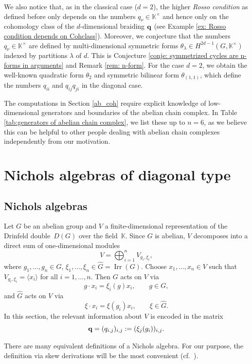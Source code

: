\documentclass[pdftex]{sigma}
\numberwithin{equation}{section}
\newcommand{\qq }{{\bf q}}
\newcommand{\KK }{\mathbb{K}}
\DeclareMathOperator{\Irr}{Irr}
\begin{document}
We also notice that, as in the classical case ($d=2$), the higher \textit{Rosso condition} as defined before only depends on the numbers $q_\nu \in \KK^\times$ and hence only on the cohomology class of the $d$-dimensional braiding $\qq$ (see Example \ref{ex: Rosso condition depends on Cohclass}). Moreover, we conjecture that the numbers $q_\nu \in \KK^\times$ are defined by multi-dimensional symmetric forms $\theta_\lambda \in H^{2d-1}(G,\KK^\times)$ indexed by partitions $\lambda$ of $d$. This is Conjecture \ref{conje: symmetrized cycles are n-forms in arguments} and Remark \ref{rem: n-form}. For the case $d=2$, we obtain the well-known quadratic form $\theta_2$ and symmetric bilinear form $\theta_{(1,1)}$, which define the numbers $q_{ii}$ and $q_{ij}q_{ji}$ in the diagonal case.

The computations in Section \ref{ab_coh} require explicit knowledge of low-dimensional generators and boundaries of the abelian chain complex. In Table \ref{tab:generators of abelian chain complex}, we list these up to $n=6$, as we believe this can be helpful to other people dealing with abelian chain complexes independently from our motivation.

\section{Nichols algebras of diagonal type}

\subsection{Nichols algebras}\label{sec: Nichols algebras}

Let $G$ be an abelian group and $V$ a finite-dimensional representation of the Drinfeld double~$D(G)$ over the field~$\KK$. Since $G$ is abelian, $V$ decomposes into a direct sum of one-dimensional modules%
\[ V = \bigoplus_{i=1}^n V_{g_i,\xi_i}, \]
where $g_1,\dots,g_n\in G$, $\xi_1,\dots,\xi_n\in \hat G=\Irr(G)$. Choose $x_1,\dots,x_n\in V$ such that $V_{g_i,\xi_i}=\langle x_i\rangle$ for all $i=1,\dots,n$.
Then $G$ acts on $V$ via
\[
g\cdot x_i = \xi_i(g) x_i, \qquad g\in G,
\]
and $\hat G$ acts on $V$ via
\[
\xi\cdot x_i = \xi(g_i) x_i, \qquad \xi\in \hat G.
\]
In this section, the relevant information about $V$ is encoded in the matrix
\[ \qq = (q_{i,j})_{i,j} := (\xi_j(g_i))_{i,j}. \]

There are many equivalent definitions of a Nichols algebra. For our purpose, the definition via skew derivations will be the most convenient (cf.~\cite{p-H-06}).
\end{document}
